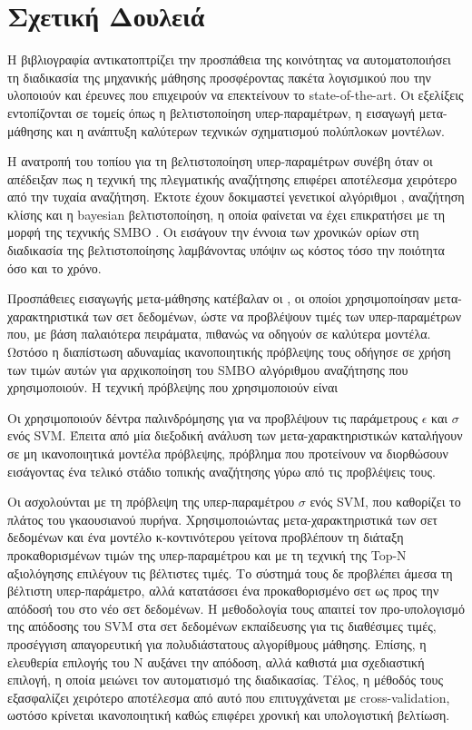 \chapter{Σχετική Δουλειά}
Η βιβλιογραφία αντικατοπτρίζει την προσπάθεια της κοινότητας να αυτοματοποιήσει τη διαδικασία της μηχανικής μάθησης προσφέροντας πακέτα λογισμικού που την υλοποιούν και έρευνες που επιχειρούν να επεκτείνουν το state-of-the-art. Οι εξελίξεις εντοπίζονται σε τομείς όπως η βελτιστοποίηση υπερ-παραμέτρων, η εισαγωγή μετα-μάθησης και η ανάπτυξη καλύτερων τεχνικών σχηματισμού πολύπλοκων μοντέλων.

Η ανατροπή του τοπίου για τη βελτιστοποίηση υπερ-παραμέτρων συνέβη όταν οι \citet{} απέδειξαν πως η τεχνική της πλεγματικής αναζήτησης επιφέρει αποτέλεσμα χειρότερο από την τυχαία αναζήτηση. Έκτοτε έχουν δοκιμαστεί γενετικοί αλγόριθμοι \citep{1554741}, αναζήτηση κλίσης \citep{wassenberg} και η bayesian βελτιστοποίηση, η οποία φαίνεται να έχει επικρατήσει με τη μορφή της τεχνικής SMBO \citep{DBLP:journals/corr/abs-1208-3719}. Οι \citet{HutHooLeyMur10} εισάγουν την έννοια των χρονικών ορίων στη διαδικασία της βελτιστοποίησης λαμβάνοντας υπόψιν ως κόστος τόσο την ποιότητα όσο και το χρόνο.

Προσπάθειες εισαγωγής μετα-μάθησης κατέβαλαν οι \citet{Feurer:2014:UMI:3015544.3015549}, οι οποίοι χρησιμοποίησαν μετα-χαρακτηριστικά των σετ δεδομένων, ώστε να προβλέψουν τιμές των υπερ-παραμέτρων που, με βάση παλαιότερα πειράματα, πιθανώς να οδηγούν σε καλύτερα μοντέλα. Ωστόσο η διαπίστωση αδυναμίας ικανοποιητικής πρόβλεψης τους οδήγησε σε χρήση των τιμών αυτών για αρχικοποίηση του SMBO αλγόριθμου αναζήτησης που χρησιμοποιούν. Η τεχνική πρόβλεψης που χρησιμοποιούν είναι 

Οι \citet{kuba2002exploiting} χρησιμοποιούν δέντρα παλινδρόμησης για να προβλέψουν τις παράμετρους $\epsilon$ και $\sigma$ ενός SVM. Έπειτα από μία διεξοδική ανάλυση των μετα-χαρακτηριστικών καταλήγουν σε μη ικανοποιητικά μοντέλα πρόβλεψης, πρόβλημα που προτείνουν να διορθώσουν εισάγοντας ένα τελικό στάδιο τοπικής αναζήτησης γύρω από τις προβλέψεις τους.


Οι \citet{Soares2004} ασχολούνται με τη πρόβλεψη της υπερ-παραμέτρου $\sigma$ ενός SVM, που καθορίζει το πλάτος του γκαουσιανού πυρήνα. Χρησιμοποιώντας μετα-χαρακτηριστικά των σετ δεδομένων και ένα μοντέλο κ-κοντινότερου γείτονα προβλέπουν τη διάταξη προκαθορισμένων τιμών της υπερ-παραμέτρου και με τη τεχνική της Top-Ν αξιολόγησης επιλέγουν τις βέλτιστες τιμές. Το σύστημά τους δε προβλέπει άμεσα τη βέλτιστη υπερ-παράμετρο, αλλά κατατάσσει ένα προκαθορισμένο σετ ως προς την απόδοσή του στο νέο σετ δεδομένων. Η μεθοδολογία τους απαιτεί τον προ-υπολογισμό της απόδοσης του SVM στα σετ δεδομένων εκπαίδευσης για τις διαθέσιμες τιμές, προσέγγιση απαγορευτική για πολυδιάστατους αλγορίθμους μάθησης. Επίσης, η ελευθερία επιλογής του Ν αυξάνει την απόδοση, αλλά καθιστά μια σχεδιαστική επιλογή, η οποία μειώνει τον αυτοματισμό της διαδικασίας. Τέλος, η μέθοδός τους εξασφαλίζει χειρότερο αποτέλεσμα από αυτό που επιτυγχάνεται με cross-validation, ωστόσο κρίνεται ικανοποιητική καθώς επιφέρει χρονική και υπολογιστική βελτίωση. 

